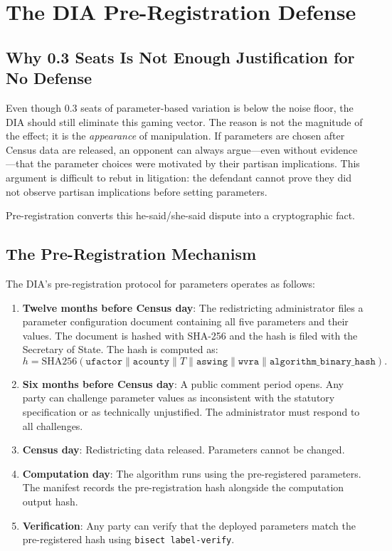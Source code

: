 \section{The DIA Pre-Registration Defense}
\label{sec:preregistration}

\subsection{Why 0.3 Seats Is Not Enough Justification for No Defense}

Even though 0.3 seats of parameter-based variation is below the noise floor,
the DIA should still eliminate this gaming vector.
The reason is not the magnitude of the effect; it is the \emph{appearance}
of manipulation.
If parameters are chosen after Census data are released, an opponent can
always argue---even without evidence---that the parameter choices were
motivated by their partisan implications.
This argument is difficult to rebut in litigation: the defendant cannot
prove they did not observe partisan implications before setting parameters.

Pre-registration converts this he-said/she-said dispute into a
cryptographic fact.

\subsection{The Pre-Registration Mechanism}

The DIA's pre-registration protocol for parameters operates as follows:

\begin{enumerate}
\item \textbf{Twelve months before Census day}: The redistricting
  administrator files a parameter configuration document containing
  all five parameters and their values.
  The document is hashed with SHA-256 and the hash is filed with the
  Secretary of State.
  The hash is computed as:
  \[
    h = \mathrm{SHA256}(\texttt{ufactor} \| \texttt{acounty} \| T
    \| \texttt{aswing} \| \texttt{wvra} \| \texttt{algorithm\_binary\_hash}).
  \]
\item \textbf{Six months before Census day}: A public comment period
  opens.
  Any party can challenge parameter values as inconsistent with the
  statutory specification or as technically unjustified.
  The administrator must respond to all challenges.
\item \textbf{Census day}: Redistricting data released.
  Parameters cannot be changed.
\item \textbf{Computation day}: The algorithm runs using the pre-registered
  parameters.
  The manifest records the pre-registration hash alongside the computation
  output hash.
\item \textbf{Verification}: Any party can verify that the deployed
  parameters match the pre-registered hash using \texttt{bisect label-verify}.
\end{enumerate}

